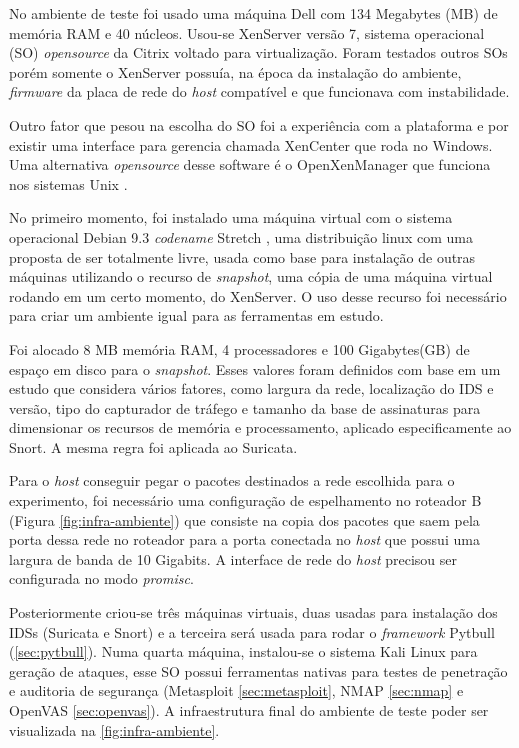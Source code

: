 No ambiente de teste foi usado uma máquina Dell com 134 Megabytes (MB) de memória RAM e 40 núcleos. Usou-se XenServer \cite{xenserver} versão 7, sistema operacional (SO) \textit{opensource} da Citrix voltado para virtualização. Foram testados outros SOs porém somente o XenServer possuía, na época da instalação do ambiente, \textit{firmware} da placa de rede do \textit{host} compatível e que funcionava com instabilidade. 
 
Outro fator que pesou na escolha do SO foi a experiência com a plataforma e por existir uma interface para gerencia chamada XenCenter que roda no Windows. Uma alternativa \textit{opensource} desse software é o OpenXenManager que funciona nos sistemas Unix \cite{openxenmanager}.

No primeiro momento, foi instalado uma máquina virtual com o sistema operacional Debian 9.3 \textit{codename} Stretch \cite{debianwheezy}, uma distribuição linux com uma proposta de ser totalmente livre, usada como base para instalação de outras máquinas utilizando o recurso de \textit{snapshot}, uma cópia de uma máquina virtual rodando em um certo momento, do XenServer. O uso desse recurso foi necessário para criar um ambiente igual para as ferramentas em estudo.

Foi alocado 8 MB memória RAM, 4 processadores e 100 Gigabytes(GB) de espaço em disco para o \textit{snapshot}. Esses valores foram definidos com base em um estudo \cite{mikelococo} que considera vários fatores, como largura da rede, localização do IDS e versão, tipo do capturador de tráfego e tamanho da base de assinaturas para dimensionar os recursos de memória e processamento, aplicado especificamente ao Snort. A mesma regra foi aplicada ao Suricata.

Para o \textit{host} conseguir pegar o pacotes destinados a rede escolhida para o experimento, foi necessário uma configuração de espelhamento no roteador B (Figura \ref{fig:infra-ambiente}) que consiste na copia dos pacotes que saem pela porta dessa rede no roteador para a porta conectada no \textit{host} que possui uma largura de banda de 10 Gigabits. A interface de rede do \textit{host} precisou ser configurada no modo \textit{promisc}.

Posteriormente criou-se três máquinas virtuais, duas usadas para instalação dos IDSs (Suricata e Snort) e a terceira será usada para rodar o \textit{framework} Pytbull (\autoref{sec:pytbull}). Numa quarta máquina, instalou-se o sistema Kali Linux \cite{kalilinux} para geração de ataques, esse SO possui ferramentas nativas para testes de penetração e auditoria de segurança (Metasploit \autoref{sec:metasploit}, NMAP \autoref{sec:nmap} e OpenVAS \autoref{sec:openvas}). A infraestrutura final do ambiente de teste poder ser visualizada na \autoref{fig:infra-ambiente}.

